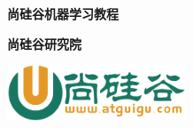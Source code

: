 \documentclass[twoside,nofonts,fancyhdr,openany,UTF8,fontset = fandol]{ctexbook}
\begin{document}
\begin{titlepage}
  \begin{center}
      \vspace*{1cm}

      \textbf{尚硅谷机器学习教程}

      \vspace{1.5cm}

      \textbf{尚硅谷研究院}

      \vfill

      \vspace{0.8cm}

      \includegraphics[width=0.4\textwidth]{atguigu.jpeg}

  \end{center}
\end{titlepage}

\tableofcontents



    
\end{document}
